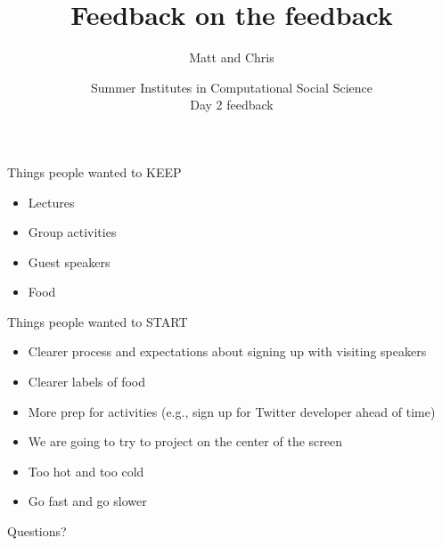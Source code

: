 \documentclass{beamer}
\title[]{Feedback on the feedback}
\author[]{Matt and Chris}
\date[]{Summer Institutes in Computational Social Science\\Day 2 feedback
}
\begin{document}
\frame{\titlepage}
\begin{frame}

Things people wanted to KEEP
\begin{itemize}
\item Lectures
\item Group activities
\item Guest speakers
\item Food
\end{itemize}

\end{frame}
\begin{frame}

Things people wanted to START
\begin{itemize}
\item Clearer process and expectations about signing up with visiting speakers
\pause
\item Clearer labels of food
\pause
\item More prep for activities (e.g., sign up for Twitter developer ahead of time)
\pause
\item We are going to try to project on the center of the screen
\pause
\item Too hot and too cold
\pause
\item Go fast and go slower
\end{itemize}

\end{frame}
\begin{frame}

\begin{center}
\LARGE
Questions?
\end{center}

\end{frame}
\end{document}
